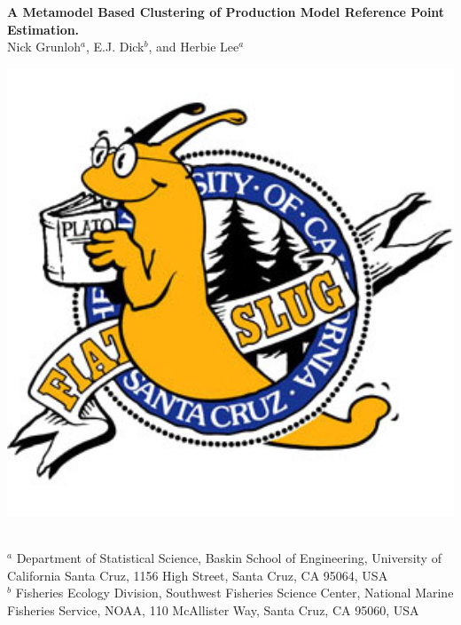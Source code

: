 \documentclass[a0paper,portrait]{baposter}
\begin{document}
\begin{poster}
{\begin{minipage}{0.14\textwidth}
\end{minipage}
\begin{minipage}{0.7\textwidth}
	\begin{center}					%
	{\huge \textbf{A Metamodel Based Clustering of Production Model Reference Point Estimation.}}\\ 
	\vspace{0.5cm}
	{\Large Nick Grunloh$^a$, E.J. Dick$^b$, and Herbie Lee$^a$}
	\end{center}
\end{minipage}
\begin{minipage}{0.14\textwidth}
	\hspace*{-0.5cm}
	\includegraphics[width=1.2\textwidth]{./fiatSlug.jpg}
\end{minipage}
\normalsize
\\ \sf
$^a$ Department of Statistical Science, Baskin School of Engineering, University of California Santa Cruz, 1156 High Street, Santa Cruz, CA 95064, USA\\
$^b$ Fisheries Ecology Division, Southwest Fisheries Science Center, National Marine Fisheries Service, NOAA, 110 McAllister Way, Santa Cruz, CA 95060, USA\\
}
\\


\end{poster}
\end{document}
